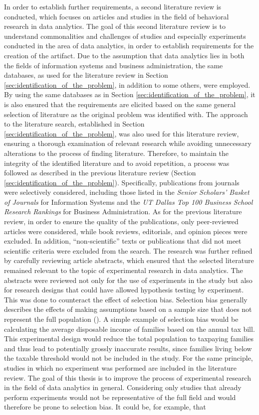 In order to establish further requirements, a second literature review is conducted, which focuses on articles and studies in the field of behavioral research in data analytics. The goal of this second literature review is to understand commonalities and challenges of studies and especially experiments conducted in the area of data analytics, in order to establish requirements for the creation of the artifact. Due to the assumption that data analytics lies in both the fields of information systems and business administration, the same databases, as used for the literature review in Section \ref{sec:identification_of_the_problem}, in addition to some others, were employed. By using the same databases as in Section \ref{sec:identification_of_the_problem}, it is also ensured that the requirements are elicited based on the same general selection of literature as the original problem was identified with. The approach to the literature search, established in Section \ref{sec:identification_of_the_problem}, was also used for this literature review, ensuring a thorough examination of relevant research while avoiding unnecessary alterations to the process of finding literature. Therefore, to maintain the integrity of the identified literature and to avoid repetition, a process was followed as described in the previous literature review (Section \ref{sec:identification_of_the_problem}). Specifically, publications from journals were selectively considered, including those listed in the \textit{Senior Scholars' Basket of Journals} for Information Systems and the \textit{UT Dallas Top 100 Business School Research Rankings} for Business Administration. As for the previous literature review, in order to ensure the quality of the publications, only peer-reviewed articles were considered, while book reviews, editorials, and opinion pieces were excluded. In addition, \enquote{non-scientific} texts or publications that did not meet scientific criteria were excluded from the search. The research was further refined by carefully reviewing article abstracts, which ensured that the selected literature remained relevant to the topic of experimental research in data analytics. The abstracts were reviewed not only for the use of experiments in the study but also for research designs that could have allowed hypothesis testing by experiment. This was done to counteract the effect of selection bias. Selection bias generally describes the effects of making assumptions based on a sample size that does not represent the full population (\cite{Heckman.2010}). A simple example of selection bias would be calculating the average disposable income of families based on the annual tax bill. This experimental design would reduce the total population to taxpaying families and thus lead to potentially grossly inaccurate results, since families living below the taxable threshold would not be included in the study. For the same principle, studies in which no experiment was performed are included in the literature review. The goal of this thesis is to improve the process of experimental research in the field of data analytics in general. Considering only studies that already perform experiments would not be representative of the full field and would therefore be prone to selection bias. It could be, for example, that 